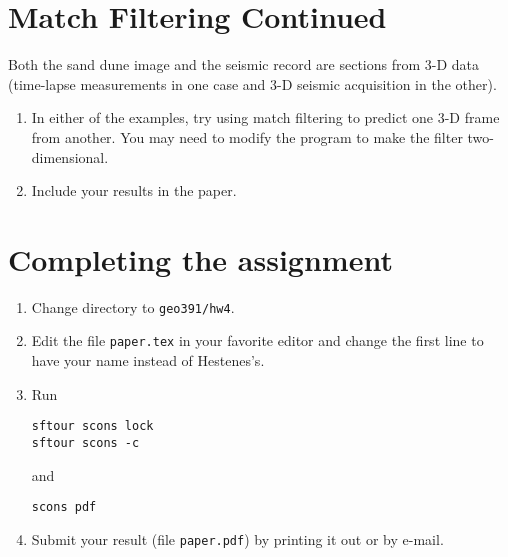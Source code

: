 \section{Match Filtering Continued}

Both the sand dune image and the seismic record are sections from 3-D
data (time-lapse measurements in one case and 3-D seismic acquisition
in the other).
\begin{enumerate}
\item In either of the examples, try using match filtering to
predict one 3-D frame from another. You may need to modify the program
to make the filter two-dimensional. 
\item Include your results in the paper.
\end{enumerate}

\section{Completing the assignment}

\begin{enumerate}
\item Change directory to \verb#geo391/hw4#.
\item Edit the file \texttt{paper.tex} in your favorite editor and change the
  first line to have your name instead of Hestenes's.
\item Run
\begin{verbatim}
sftour scons lock
sftour scons -c
\end{verbatim}
and
\begin{verbatim}
scons pdf
\end{verbatim}
\item Submit your result (file \texttt{paper.pdf}) by printing it out
  or by e-mail.
\end{enumerate}